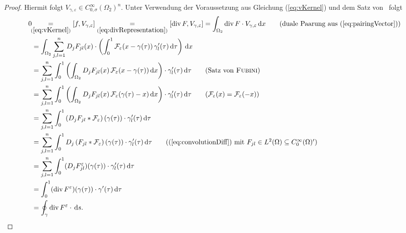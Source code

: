 \begin{proof}
  Hiermit folgt $V_{\gamma,\varepsilon} \in C_{0,\sigma}^\infty(\Omega_2)^n$.
  Unter Verwendung der Voraussetzung aus Gleichung (\ref{eq:vKernel}) und dem Satz von \fubini\ folgt
  \begingroup
  \addtolength{\jot}{1em}
  \begin{align*}
    0
    &\hspace{-0.15cm}\underset{(\ref{eq:vKernel})}{=} [f, V_{\gamma, \varepsilon}] %
    \underset{(\ref{eq:divRepresentation})}{=} [\div F, V_{\gamma, \varepsilon}] %
    = \int_{\Omega_2} \div F \cdot V_{\gamma, \varepsilon} \d x \tag{duale Paarung aus (\ref{eq:pairingVector})} \\
    &= \int_{\Omega_2} \sum_{j,l=1}^n D_j F_{jl}(x) \cdot \left( \int_0^1 \mathcal{F}_\varepsilon(x - \gamma(\tau)) \, \gamma_l'(\tau) \d\tau \right) \d x \\
    &= \sum_{j,l=1}^n \int_0^1 \left(\int_{\Omega_2}  D_j F_{jl}(x) \, \mathcal{F}_\varepsilon(x - \gamma(\tau))\d x \right) \cdot \gamma_l'(\tau) \d\tau \tag{Satz von \fubini}\\
    &= \sum_{j,l=1}^n \int_0^1 \left(\int_{\Omega_2}  D_j F_{jl}(x) \, \mathcal{F}_\varepsilon(\gamma(\tau) - x)\d x \right) \cdot \gamma_l'(\tau) \d\tau \tag{$\mathcal{F}_\varepsilon(x) = \mathcal{F}_\varepsilon(-x)$}\\
    &= \sum_{j,l=1}^n \int_0^1 \left(D_j F_{jl} \ast \mathcal{F}_\varepsilon\right)(\gamma(\tau)) \cdot \gamma_l'(\tau) \d\tau \\
    &= \sum_{j,l=1}^n \int_0^1 D_j\left(F_{jl} \ast \mathcal{F}_\varepsilon\right)(\gamma(\tau)) \cdot \gamma_l'(\tau) \d\tau \tag{(\ref{eq:convolutionDiff}) mit $F_{jl} \in L^2(\Omega) \subseteq C_0^\infty(\Omega)'$}\\
    &= \sum_{j,l=1}^n \int_0^1 (D_j F_{jl}^\varepsilon)(\gamma(\tau)) \cdot \gamma_l'(\tau) \d\tau \\
    &= \int_0^1 (\div F^\varepsilon)(\gamma(\tau)) \cdot \gamma'(\tau) \d\tau \\
    &= \oint_\gamma \div F^\varepsilon \cdot \d s.
  \end{align*}
  \endgroup


\end{proof}

